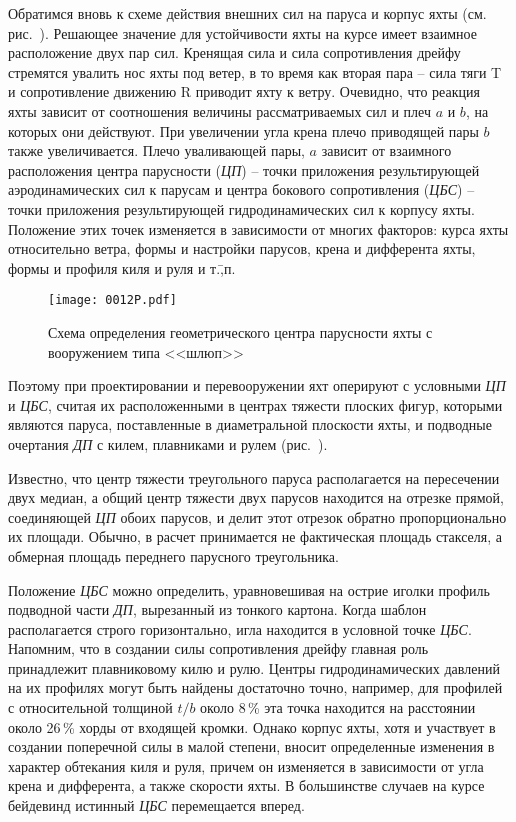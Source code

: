 Обратимся вновь к схеме действия внешних сил на паруса и корпус яхты (см. рис.~). Решающее значение для устойчивости яхты на курсе имеет взаимное расположение двух пар сил. Кренящая сила  и сила сопротивления дрейфу  стремятся увалить нос яхты под ветер, в то время как вторая пара \--- сила тяги \ve T и сопротивление движению \ve R приводит яхту к ветру. Очевидно, что реакция яхты зависит от соотношения величины рассматриваемых сил и плеч $a$ и $b$, на которых они действуют. При увеличении угла крена плечо приводящей пары $b$ также увеличивается. Плечо уваливающей пары, $a$ зависит от взаимного расположения центра парусности (\textit{ЦП}) \--- точки приложения результирующей аэродинамических сил к парусам и центра бокового сопротивления (\textit{ЦБС}) \--- точки приложения результирующей гидродинамических сил к корпусу яхты. Положение этих точек изменяется в зависимости от многих факторов: курса яхты относительно ветра, формы и настройки парусов, крена и дифферента яхты, формы и профиля киля и руля и т.\=,п.

\begin{figure}[htb]
  \centering
  \texttt{[image: 0012P.pdf]}
  \caption{Схема определения геометрического центра парусности яхты с вооружением типа <<шлюп>>}
  \label{fig:12}
\end{figure}

Поэтому при проектировании и перевооружении яхт оперируют с условными \textit{ЦП} и \textit{ЦБС}, считая их расположенными в центрах тяжести плоских фигур, которыми являются паруса, поставленные в диаметральной плоскости яхты, и подводные очертания \textit{ДП} с килем, плавниками и рулем (рис.~). 

Известно, что центр тяжести треугольного паруса располагается на пересечении двух медиан, а общий центр тяжести двух парусов находится на отрезке прямой, соединяющей \textit{ЦП} обоих парусов, и делит этот отрезок обратно пропорционально их площади. Обычно, в расчет принимается не фактическая площадь стакселя, а обмерная площадь переднего парусного треугольника. 

Положение \textit{ЦБС} можно определить, уравновешивая на острие иголки профиль подводной части \textit{ДП}, вырезанный из тонкого картона. Когда шаблон располагается строго горизонтально, игла находится в условной точке \textit{ЦБС}. Напомним, что в создании силы сопротивления дрейфу главная роль принадлежит плавниковому килю и рулю. Центры гидродинамических давлений на их профилях могут быть найдены достаточно точно, например, для профилей с относительной толщиной $t/b$ около 8\,\% эта точка находится на расстоянии около 26\,\% хорды от входящей кромки. Однако корпус яхты, хотя и участвует в создании поперечной силы в малой степени, вносит определенные изменения в характер обтекания киля и руля, причем он изменяется в зависимости от угла крена и дифферента, а также скорости яхты. В большинстве случаев на курсе бейдевинд истинный \textit{ЦБС} перемещается вперед. 

